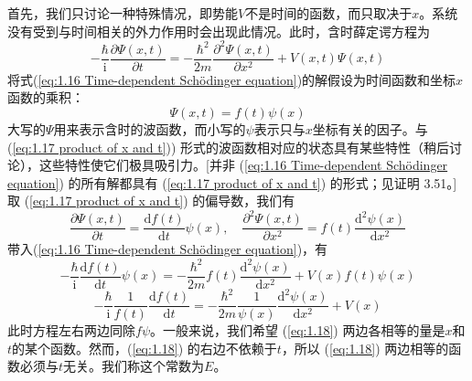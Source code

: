 	首先，我们只讨论一种特殊情况，即势能$V$不是时间的函数，而只取决于$x$。系统没有受到与时间相关的外力作用时会出现此情况。此时，含时薛定谔方程为
	\begin{equation}
		-\frac{\hbar}{\mathrm{i}}\frac{\partial \Psi \left(x,t\right)}{\partial t}= -\frac{\hbar^2}{2m}\frac{\partial^2 \Psi \left(x,t\right)}{\partial x^2}+ V\left(x,t\right)\Psi\left(x,t\right)
		\label{eq:1.16 Time-dependent Schödinger equation}
	\end{equation}
	将式(\ref{eq:1.16 Time-dependent Schödinger equation})的解假设为时间函数和坐标$x$函数的乘积：
	\begin{equation}
		\boxed{\Psi\left(x,t\right)=f\left(t\right)\psi\left(x\right)}
		\label{eq:1.17 product of x and t}
	\end{equation}
	大写的$\Psi$用来表示含时的波函数，而小写的$\psi$表示只与$x$坐标有关的因子。与 (\ref{eq:1.17 product of x and t})) 形式的波函数相对应的状态具有某些特性（稍后讨论），这些特性使它们极具吸引力。[并非 (\ref{eq:1.16 Time-dependent Schödinger equation}) 的所有解都具有 (\ref{eq:1.17 product of x and t}) 的形式；见证明 3.51。]取 (\ref{eq:1.17 product of x and t}) 的偏导数，我们有
	\begin{equation*}
		\frac{\partial \Psi\left(x,t\right)}{\partial t} = \frac{\mathrm{d} f\left(t\right)}{\mathrm{d}t} \psi\left(x\right), \quad \frac{\partial^2 \Psi \left(x,t\right)}{\partial x^2}= f\left(t\right) \frac{\mathrm{d}^2\psi\left(x\right)}{\mathrm{d}x^2}
	\end{equation*}
	带入(\ref{eq:1.16 Time-dependent Schödinger equation})，有
	\begin{equation*}
		-\frac{\hbar}{\mathrm{i}}\frac{\mathrm{d}f\left(t\right)}{\mathrm{d}t}\psi\left(x\right)=-\frac{\hbar^2}{2m}f\left(t\right)\frac{\mathrm{d}^2\psi\left(x\right)}{\mathrm{d}x^2}+V\left(x\right)f\left(t\right)\psi\left(x\right)
	\end{equation*}
	\begin{equation}
			-\frac{\hbar}{\mathrm{i}}\frac{1}{f\left(t\right)}\frac{\mathrm{d}f\left(t\right)}{\mathrm{d}t}=-\frac{\hbar^2}{2m}\frac{1}{\psi\left(x\right)}\frac{\mathrm{d}^2\psi\left(x\right)}{\mathrm{d}x^2}+V\left(x\right)
			\label{eq:1.18}
	\end{equation}
	此时方程左右两边同除$f\psi$。一般来说，我们希望 (\ref{eq:1.18}) 两边各相等的量是$x$和$t$的某个函数。然而，(\ref{eq:1.18}) 的右边不依赖于$t$，所以 (\ref{eq:1.18}) 两边相等的函数必须与$t$无关。我们称这个常数为$E$。

